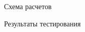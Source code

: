 \documentclass{beamer}
\begin{document}
\begin{frame}{Схема расчетов}
	\begin{figure}[h]
		\label{ris:scheme}
	\end{figure}
\end{frame}





\begin{frame}{Результаты тестирования}
\end{frame}
\end{document}
